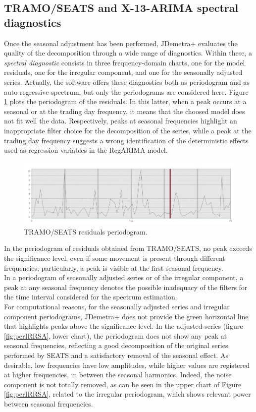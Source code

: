\documentclass[english,blauw]{cbsdiscussionpaper}
\begin{document}
\subsection{TRAMO/SEATS and X-13-ARIMA spectral diagnostics}
Once the seasonal adjustment has been performed, JDemetra+ evaluates the quality of the decomposition through a wide range of diagnostics. Within these, a \textit{spectral diagnostic} consists in three frequency-domain charts, one for the model residuals, one for the irregular component, and one for the seasonally adjusted series. Actually, the software offers these diagnostics both as periodogram and as auto-regressive spectrum, but only the periodograms are considered here. Figure \ref{fig:perRES} plots the periodogram of the residuals. In this latter, when a peak occurs at a seasonal or at the trading day frequency, it means that the choosed model does not fit well the data. Respectively, peaks at seasonal frequencies highlight an inappropriate filter choice for the decomposition of the series, while a peak at the trading day frequency suggests a wrong identification of the deterministic effects used as regression variables in the RegARIMA model.
\begin{figure}[h]
\includegraphics[width=\linewidth]{../images/capitolo3/perRES.jpg}
\caption{TRAMO/SEATS residuals periodogram.}
\label{fig:perRES}
\end{figure}
In the periodogram of residuals obtained from TRAMO/SEATS,  no peak exceeds the significance level, even if some movement is present through different frequencies; particularly, a peak is visible at the first seasonal frequency.\\In a periodogram of seasonally adjusted series or of the irregular component, a peak at any seasonal frequency denotes the possible inadequacy of the filters for the time interval considered for the spectrum estimation.\\For computational reasons, for the seasonally adjusted series and irregular component periodograms, JDemetra+  does not provide the green horizontal line that highlights peaks above the significance level. In the adjusted series (figure \ref{fig:perIRRSA}, lower chart), the periodogram does not show any peak at seasonal frequencies, reflecting a good decomposition of the original series performed by SEATS and a satisfactory removal of the seasonal effect. As desirable, low frequencies have low amplitudes, while higher values are registered at higher frequencies, in between the seasonal harmonics. Indeed, the noise component is not totally removed, as can be seen in the upper chart of Figure \ref{fig:perIRRSA}, related to the irregular periodogram, which shows relevant power between seasonal frequencies.
\end{document}
